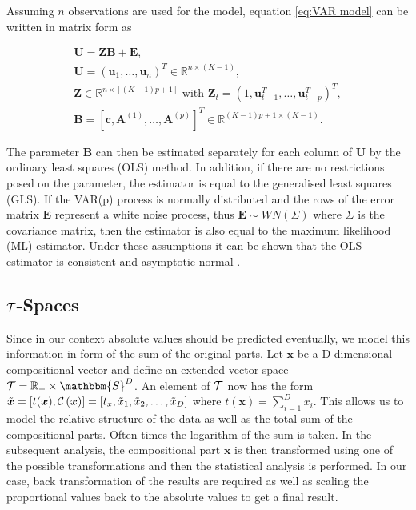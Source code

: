 Assuming $n$ observations are used for the model, equation \ref{eq:VAR model} can be written in matrix form as

\begin{gather*}
\textbf{U} = \textbf{ZB} + \textbf{E}, \\
\textbf{U} = (\textbf{u}_1,\ldots,\textbf{u}_n)^T \in \mathbb{R}^{n \times (K-1)}, \\
\textbf{Z} \in \mathbb{R}^{n \times \left[(K-1)p+1\right]} \text{ with } \textbf{Z}_t = \left(1,\textbf{u}_{t-1}^T,\ldots,\textbf{u}_{t-p}^T\right)^T, \\ %
\textbf{B} = \left[\textbf{c},\textbf{A}^{(1)}, \ldots, \textbf{A}^{(p)}\right]^T \in \mathbb{R}^{(K-1)p +1 \times (K-1)}.
\label{eq:VAR model matrix}
\end{gather*}


The parameter $\textbf{B}$ can then be estimated separately for each column of $\textbf{U}$ by the ordinary least squares (OLS) method. In addition, if there are no restrictions posed on the parameter, the estimator is equal to the generalised least squares (GLS). If the VAR(p) process is normally distributed and the rows of the error matrix $\textbf{E}$ represent a white noise process, thus $\bm{E} \sim WN(\Sigma)$ where $\Sigma$ is the covariance matrix, then the estimator is also equal to the maximum likelihood (ML) estimator. 
Under these assumptions it can be shown that the OLS estimator is consistent and asymptotic normal \cite{Kynclova:2015} \cite{Luetkepohl:2007}. 


\subsection{$\mathcal{T}$-Spaces}
\label{sec: Tspaces}

Since in our context absolute values should be predicted eventually, we model this information in form of the sum of the original parts. Let $\textbf{x}$ be a D-dimensional compositional vector and define an extended vector space $\Tsp = \mathbb{R}_+ \times \mathbbm{S}^D$.  An element of $\mathcal{T}$ now has the form $\tilde{\bm{x}} = \left[t(\bm{x}),\mathcal{C}\left({\bm{x}}\right)\right] = \left[t_x,\tilde{x}_1,\tilde{x}_2,\ldots,\tilde{x}_D \right]$ where $t(\bm{x})= \sum_{i=1}^D x_i$. This allows us to model the relative structure of the data as well as the total sum of the compositional parts. Often times the logarithm of the sum is taken. In the subsequent analysis, the compositional part $\bm{x}$ is then transformed using one of the possible transformations and then the statistical analysis is performed. In our case, back transformation of the results are required as well as scaling the proportional values back to the absolute values to get a final result. \cite{Kynclova:2015}


